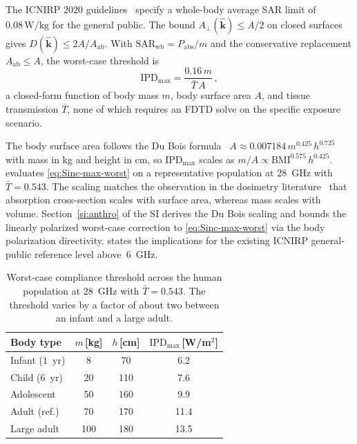 \documentclass[journal,twocolumn,10pt]{IEEEtran}
\theoremstyle{plain}
\newcommand{\khat}{\hat{\bm{k}}}
\newcommand{\IPD}{\mathrm{IPD}}
\newcommand{\Aab}{A_{\mathrm{ab}}}
\newcommand{\Aperp}{A_\perp}
\newcommand{\Tbar}{\bar{T}}
\begin{document}
The ICNIRP 2020 guidelines~\cite{ICNIRP2020} specify a whole-body
average SAR limit of $0.08\,\mathrm{W/kg}$ for the general public. The bound
$\Aperp(\khat) \le A/2$ on closed surfaces gives
$D(\khat) \le 2A/\Aab$. With $\mathrm{SAR}_{\mathrm{wb}} =
P_{\mathrm{abs}}/m$ and the conservative replacement $\Aab \le A$,
the worst-case threshold is
\begin{equation}\label{eq:Sinc-max-worst}
  \IPD_{\mathrm{max}} = \frac{0.16\,m}{\Tbar\,A}\, ,
\end{equation}
a closed-form function of body mass $m$, body surface area $A$,
and tissue transmission $\Tbar$, none of which requires an FDTD
solve on the specific exposure scenario.

The body surface area follows the Du Bois formula~\cite{DuBois1916} $A
\approx 0.007184\,m^{0.425}\,h^{0.725}$ with mass in kg and height in
cm, so $\IPD_{\mathrm{max}}$ scales as $m/A \propto
\mathrm{BMI}^{0.575}\,h^{0.425}$.  evaluates
\eqref{eq:Sinc-max-worst} on a representative population at
$28$~GHz with $\Tbar = 0.543$. The scaling
matches the observation in the dosimetry
literature~\cite{Hirata2007corr,Dimbylow2002} that absorption
cross-section scales with surface area, whereas mass scales with
volume. Section~\ref{si:anthro} of the SI derives the Du Bois
scaling and bounds the linearly polarized worst-case correction to
\eqref{eq:Sinc-max-worst} via the body polarization directivity.
 states the implications for the existing
ICNIRP general-public reference level above~$6$~GHz.

\begin{table}[!t]
\centering
\caption{Worst-case compliance threshold across the human
population at $28$~GHz with $\Tbar = 0.543$. The threshold
varies by a factor of about two between an infant and a large adult.}
\label{tab:anthro}
\small
\setlength{\tabcolsep}{3pt}
\begin{tabular}{lccc}
\toprule
Body type & $m$\,[kg] & $h$\,[cm] & $\IPD_{\mathrm{max}}$\,[W/m$^2$] \\
\midrule
Infant ($1$~yr) & 8   & 70  & 6.2  \\
Child ($6$~yr)  & 20  & 110 & 7.6  \\
Adolescent      & 50  & 160 & 9.9  \\
Adult (ref.)    & 70  & 170 & 11.4 \\
Large adult     & 100 & 180 & 13.5 \\
\bottomrule
\end{tabular}
\end{table}
\end{document}
